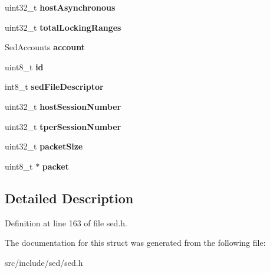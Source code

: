 \begin{DoxyCompactItemize}
\item 
\hypertarget{structsedContext_a381a0692208797a870f67d606031e3c2}{}uint32\+\_\+t {\bfseries host\+Asynchronous}\label{structsedContext_a381a0692208797a870f67d606031e3c2}

\item 
\hypertarget{structsedContext_a3d58740ea0db77eceba463c908514e91}{}uint32\+\_\+t {\bfseries total\+Locking\+Ranges}\label{structsedContext_a3d58740ea0db77eceba463c908514e91}

\item 
\hypertarget{structsedContext_a6d9ab9df14ea60d9f3bd01eb3a00382f}{}Sed\+Accounts {\bfseries account}\label{structsedContext_a6d9ab9df14ea60d9f3bd01eb3a00382f}

\item 
\hypertarget{structsedContext_a4f925293cded9ad6002cc1a771779250}{}uint8\+\_\+t {\bfseries id}\label{structsedContext_a4f925293cded9ad6002cc1a771779250}

\item 
\hypertarget{structsedContext_ac47fb0b5efff1b42e566a306405a9b16}{}int8\+\_\+t {\bfseries sed\+File\+Descriptor}\label{structsedContext_ac47fb0b5efff1b42e566a306405a9b16}

\item 
\hypertarget{structsedContext_aa87bb89edc98cc33893f7c4d67d4846f}{}uint32\+\_\+t {\bfseries host\+Session\+Number}\label{structsedContext_aa87bb89edc98cc33893f7c4d67d4846f}

\item 
\hypertarget{structsedContext_a08824a8375e6ea41b537e58876fcef12}{}uint32\+\_\+t {\bfseries tper\+Session\+Number}\label{structsedContext_a08824a8375e6ea41b537e58876fcef12}

\item 
\hypertarget{structsedContext_a4374bb7fc73aa1ff5e5324ce9383fe36}{}uint32\+\_\+t {\bfseries packet\+Size}\label{structsedContext_a4374bb7fc73aa1ff5e5324ce9383fe36}

\item 
\hypertarget{structsedContext_a1d347b0abb6a691b22dfd3c8d886a7f8}{}uint8\+\_\+t $\ast$ {\bfseries packet}\label{structsedContext_a1d347b0abb6a691b22dfd3c8d886a7f8}

\end{DoxyCompactItemize}


\subsection{Detailed Description}


Definition at line 163 of file sed.\+h.



The documentation for this struct was generated from the following file\+:\begin{DoxyCompactItemize}
\item 
src/include/sed/sed.\+h\end{DoxyCompactItemize}
